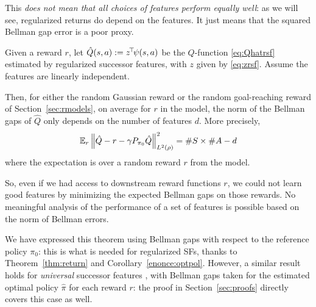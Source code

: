 \documentclass[11pt,a4paper]{article}
\newcommand{\option}[1]{{\color[rgb]{.4,0,.8}[Optional:#1]}} %
\renewcommand{\option}[1]{}  %
\begin{document}
This \emph{does not mean that all choices of features perform equally
well}: as we will see, regularized returns do depend on the features. It
just means that the squared Bellman gap error is a poor proxy.

\begin{prop}
\label{prop:gap}
Given a reward $r$, let $\hat Q(s,a)\mathrel{\mathop{:}}= z^{\!\top}\!\psi(s,a)$ be the
$Q$-function \eqref{eq:Qhatrsf} estimated by regularized successor features, with $z$ given
by \eqref{eq:zrsf}. Assume the features are linearly independent.

Then, for either the random Gaussian reward or the random goal-reaching reward of Section~\ref{sec:rmodels}, on
average for $r$ in the model,
the norm of the Bellman gaps of $\hat Q$ only depends on the
number of features $d$. More precisely,
\begin{equation}
\mathbb{E}_r \left\lVert\hat Q-r-\gamma P_{\pi_0} \hat Q\right\rVert^2_{L^2(\rho)}=\#S\times \#A-d
\end{equation}
where the expectation is over a random reward $r$ from the model.
\option{ scattered model}
\end{prop}

So, even if we had access to downstream reward functions $r$, we could
not learn good features by minimizing the expected Bellman gaps on those
rewards.  No meaningful analysis of the performance of a set of features
is possible based on the norm of Bellman errors.

We have expressed this theorem using
Bellman gaps with respect to the reference policy $\pi_0$: this is what is needed for
regularized SFs, thanks to Theorem~\ref{thm:return} and
Corollary~\ref{enonce:optpol}. However, a
similar
result holds for \emph{universal} successor features
\cite{borsa2018universal}, with Bellman gaps
taken for the estimated optimal policy $\hat \pi$ for each reward
$r$: the proof in Section~\ref{sec:proofs} directly covers this case
as well.

\bigskip
\end{document}
